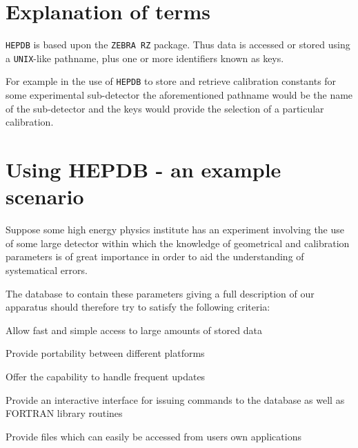 \section{Explanation of terms}
{\tt HEPDB} is based upon the {\tt ZEBRA RZ} package. Thus data is accessed
or stored using a {\tt UNIX}-like pathname, plus one or more identifiers
known as keys.
\par
For example in the use of {\tt HEPDB} to store and retrieve calibration
constants for some experimental sub-detector the aforementioned pathname
would be the name of the sub-detector and the keys would provide the selection of
a particular calibration.
%
%
%
\section{Using HEPDB - an example scenario}
Suppose some high energy physics institute has an experiment
involving the use of some large detector within which the
knowledge of geometrical and calibration parameters is of
great importance in order to aid the understanding of
systematical errors.
\par
The database to contain these parameters giving a full description
of our apparatus should therefore try to satisfy the following
criteria:
\begin{OL}
\item  Allow fast and simple access to large amounts of stored data
\item  Provide portability between different platforms
\item  Offer the capability to handle frequent updates
\item  Provide an interactive interface for issuing commands
to the database as well as FORTRAN library routines
\item  Provide files which can easily be accessed from users own
applications
\end{OL}

%
%
%
